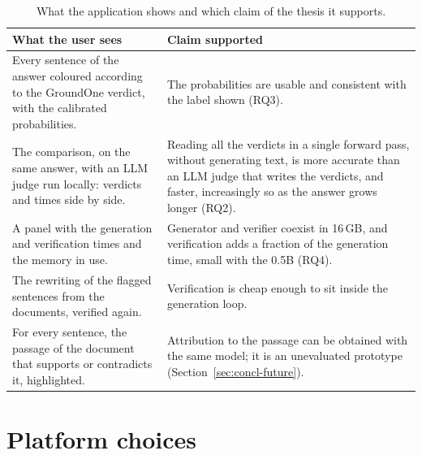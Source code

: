 \begin{table}[htbp]
\centering
\caption{What the application shows and which claim of the thesis it supports.}
\label{tab:studio-requirements}
\small
\begin{tabular}{>{\raggedright\arraybackslash}p{6.2cm}>{\raggedright\arraybackslash}p{6.8cm}}
\toprule
What the user sees & Claim supported \\
\midrule
Every sentence of the answer coloured according to the GroundOne verdict, with the calibrated probabilities. & The probabilities are usable and consistent with the label shown (RQ3). \\ \addlinespace[2pt]
The comparison, on the same answer, with an LLM judge run locally: verdicts and times side by side. & Reading all the verdicts in a single forward pass, without generating text, is more accurate than an LLM judge that writes the verdicts, and faster, increasingly so as the answer grows longer (RQ2). \\ \addlinespace[2pt]
A panel with the generation and verification times and the memory in use. & Generator and verifier coexist in 16\,GB, and verification adds a fraction of the generation time, small with the 0.5B (RQ4). \\ \addlinespace[2pt]
The rewriting of the flagged sentences from the documents, verified again. & Verification is cheap enough to sit inside the generation loop. \\ \addlinespace[2pt]
For every sentence, the passage of the document that supports or contradicts it, highlighted. & Attribution to the passage can be obtained with the same model; it is an unevaluated prototype (Section~\ref{sec:concl-future}). \\
\bottomrule
\end{tabular}
\end{table}

\section{Platform choices}
\label{sec:studio-platform}


